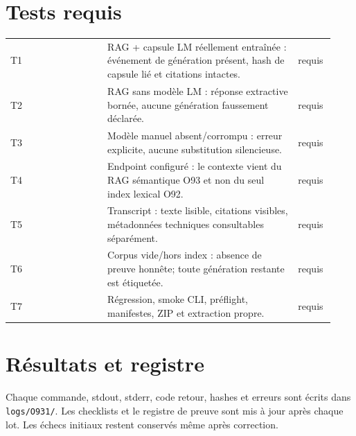 \documentclass[11pt,a4paper]{article}
\begin{document}
\section{Tests requis}
\begin{longtable}{p{0.28\linewidth}p{0.55\linewidth}p{0.1\linewidth}}
T1 & RAG + capsule LM réellement entraînée : événement de génération présent, hash de capsule lié et citations intactes. & requis\\
T2 & RAG sans modèle LM : réponse extractive bornée, aucune génération faussement déclarée. & requis\\
T3 & Modèle manuel absent/corrompu : erreur explicite, aucune substitution silencieuse. & requis\\
T4 & Endpoint configuré : le contexte vient du RAG sémantique O93 et non du seul index lexical O92. & requis\\
T5 & Transcript : texte lisible, citations visibles, métadonnées techniques consultables séparément. & requis\\
T6 & Corpus vide/hors index : absence de preuve honnête; toute génération restante est étiquetée. & requis\\
T7 & Régression, smoke CLI, préflight, manifestes, ZIP et extraction propre. & requis\\
\end{longtable}
\section{Résultats et registre}
Chaque commande, stdout, stderr, code retour, hashes et erreurs sont écrits dans \texttt{logs/O931/}. Les checklists et le registre de preuve sont mis à jour après chaque lot. Les échecs initiaux restent conservés même après correction.
\end{document}
